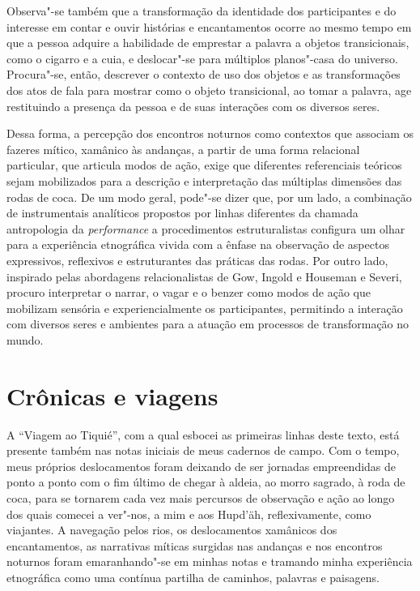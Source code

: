Observa"-se também que a transformação da identidade dos participantes e
do interesse em contar e ouvir histórias e encantamentos ocorre ao mesmo
tempo em que a pessoa adquire a habilidade de emprestar a palavra a
objetos transicionais, como o cigarro e a cuia, e deslocar"-se para
múltiplos planos"-casa do universo. Procura"-se, então, descrever o
contexto de uso dos objetos e as transformações dos atos de fala para
mostrar como o objeto transicional, ao tomar a palavra, age restituindo
a presença da pessoa e de suas interações com os diversos seres.

Dessa forma, a percepção dos encontros noturnos como contextos que
associam os fazeres mítico, xamânico às andanças, a partir de uma forma
relacional particular, que articula modos de ação, exige que diferentes
referenciais teóricos sejam mobilizados para a descrição e interpretação
das múltiplas dimensões das rodas de coca. De um modo geral, pode"-se
dizer que, por um lado, a combinação de instrumentais analíticos
propostos por linhas diferentes da chamada antropologia da
\textit{performance} a procedimentos estruturalistas configura um olhar
para a experiência etnográfica vivida com a ênfase na observação de
aspectos expressivos, reflexivos e estruturantes das práticas das rodas.
Por outro lado, inspirado pelas abordagens relacionalistas de Gow,
Ingold e Houseman e Severi, procuro interpretar o narrar, o vagar e o
benzer como modos de ação que mobilizam sensória e experiencialmente os
participantes, permitindo a interação com diversos seres e ambientes
para a atuação em processos de transformação no mundo.

\section{Crônicas e viagens}\label{cruxf4nicas-e-viagens}

A ``Viagem ao Tiquié'', com a qual esbocei as primeiras linhas deste
texto, está presente também nas notas iniciais de meus cadernos de
campo. Com o tempo, meus próprios deslocamentos foram deixando de ser
jornadas empreendidas de ponto a ponto com o fim último de chegar à
aldeia, ao morro sagrado, à roda de coca, para se tornarem cada vez mais
percursos de observação e ação ao longo dos quais comecei a ver"-nos, a
mim e aos Hupd'äh, reflexivamente, como viajantes. A navegação pelos
rios, os deslocamentos xamânicos dos encantamentos, as narrativas
míticas surgidas nas andanças e nos encontros noturnos foram
emaranhando"-se em minhas notas e tramando minha experiência etnográfica
como uma contínua partilha de caminhos, palavras e paisagens.

